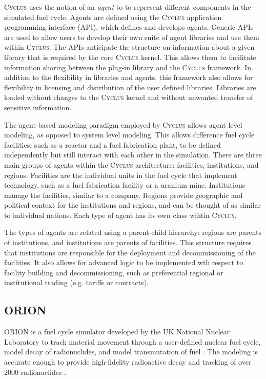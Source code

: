 \documentclass{article}
\newcommand{\Cyclus}{\textsc{Cyclus}\xspace}%
\begin{document}
    \Cyclus uses the notion of an \textit{agent} to to represent different 
    components in the simulated fuel cycle. Agents are 
    defined using the \Cyclus application programming interface (API), which 
    defines and develops agents. Generic APIs are used to allow users 
    to develop their own suite of agent libraries and use them within \Cyclus. 
    The APIs anticipate the structure on information about a given library 
    that is required by the core \Cyclus kernel. This allows them to facilitate 
    information sharing between the plug-in library and the \Cyclus framework. 
    In addition to the flexibility in libraries and agents, this framework 
    also allows for flexibility in licensing and distribution of the user 
    defined libraries. Libraries are loaded without changes to the \Cyclus 
    kernel and without unwanted transfer of sensitive information. 

    The agent-based modeling paradigm employed by \Cyclus allows agent level 
    modeling, as opposed to system level modeling. This allows difference 
    fuel cycle facilities, such as a reactor and a fuel fabrication plant, to 
    be defined independently but still interact with each other in the 
    simulation. There are three main groups of agents within the \Cyclus 
    architecture: facilities, institutions, and regions. Facilities are 
    the individual units in the fuel cycle that implement technology, 
    such as a fuel fabrication facility or a uranium mine. Institutions 
    manage the facilities, similar to a company. Regions provide geographic 
    and political context for the institutions and regions, and can be thought 
    of as similar to individual nations. Each type of agent has its own 
    class wihtin \Cyclus. 

    The types of agents are related using a parent-child hierarchy: regions are
    parents of institutions, and institutions are parents of facilities. This 
    structure requires that institutions are responsible for the deployment 
    and decommissioning of the facilities. It also allows for advanced logic 
    to be implemented wth respect to facility building and decommissioning, 
    such as preferential regional or institutional trading (e.g. tariffs or 
    contracts). 

    

    \subsection{ORION}
    ORION is a fuel cycle simulator developed by the UK National Nuclear 
    Laboratory to track material movement through a user-defined nuclear 
    fuel cycle, model decay of radionuclides, and model transmutation of fuel
    \cite{gregg_analysis_2012}. The modeling is accurate enough to provide 
    high-fidelity radioactive decay and tracking of over 2000 radionuclides
    \cite{feng_standardized_2016}. 
    
\end{document}
